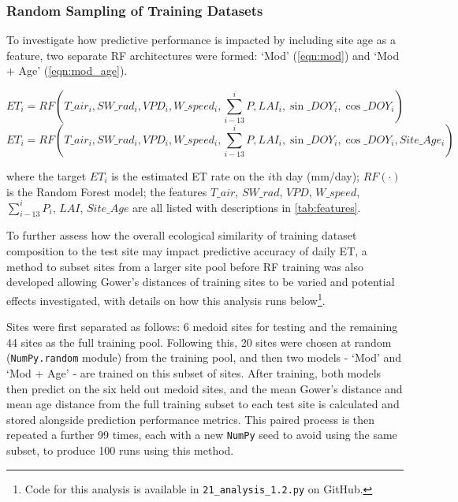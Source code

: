 \subsubsection{Random Sampling of Training Datasets} \label{sec:shuffle}
To investigate how predictive performance is impacted by including site age as a feature, two separate \ac{RF} architectures were formed: `Mod' (\autoref{eqn:mod}) and `Mod + Age' (\autoref{eqn:mod_age}).

\begin{equation}
	ET_i = RF\left(T\_air_i, SW\_rad_i, VPD_i, W\_speed_i, \sum_{i - 13}^{i}P, LAI_i, \sin\_DOY_i, \cos\_DOY_i\right)
	\label{eqn:mod}
\end{equation}
\vspace{-0.75em}
\begin{equation}
	ET_i = RF\left(T\_air_i, SW\_rad_i, VPD_i, W\_speed_i, \sum_{i - 13}^{i}P, LAI_i, \sin\_DOY_i, \cos\_DOY_i, Site\_Age_i\right)
	\label{eqn:mod_age}
\end{equation}

where the target $ET_i$ is the estimated \ac{ET} rate on the $i$th day (mm/day); $RF(\cdot)$ is the Random Forest model; the features $T\_air$, $SW\_rad$, $VPD$, $W\_speed$, $\sum_{i - 13}^{i}P_i$, $LAI$, $Site\_Age$ are all listed with descriptions in \autoref{tab:features}. 
\par To further assess how the overall ecological similarity of training dataset composition to the test site may impact predictive accuracy of daily \ac{ET}, a method to subset sites from a larger site pool before \ac{RF} training was also developed allowing Gower's distances of training sites to be varied and potential effects investigated, with details on how this analysis runs below\footnote{Code for this analysis is available in \texttt{21\_analysis\_1.2.py} on GitHub.}. 
\par Sites were first separated as follows: 6 medoid sites for testing and the remaining 44 sites as the full training pool. Following this, 20 sites were chosen at random (\texttt{NumPy.random} module) from the training pool, and then two models - `Mod' and `Mod + Age' - are trained on this subset of sites. After training, both models then predict on the six held out medoid sites, and the mean Gower's distance and mean age distance from the full training subset to each test site is calculated and stored alongside prediction performance metrics. This paired process is then repeated a further 99 times, each with a new \texttt{NumPy} seed to avoid using the same subset, to produce 100 runs using this method.


